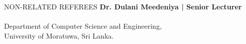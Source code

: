 \documentclass{cv}
\begin{document}

\begin{rSection}{NON-RELATED REFEREES}
    {\bf Dr. Dulani Meedeniya | Senior Lecturer}
    \\ 
    \\ Department of Computer Science and Engineering, \\
    University of Moratuwa,
    Sri Lanka.\par
\end{rSection}
\end{document}
